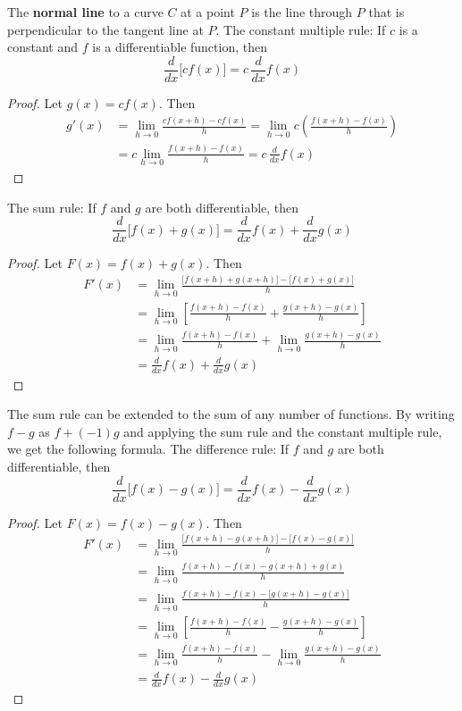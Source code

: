 The \textbf{normal line} to a curve \(C\) at a point \(P\) is the line through
\(P\) that is perpendicular to the tangent line at \(P\).
The constant multiple rule:
If \(c\) is a constant and \(f\) is a differentiable function, then
\[\frac{d}{dx}\bigl[cf(x)\bigr]=c\,\frac{d}{dx}f(x)\]
\begin{proof}
    Let \(g(x)=cf(x)\).
    Then
    \begin{align*}
        g'(x) &= \lim_{h\to 0}\frac{cf(x+h)-cf(x)}{h}
        =\lim_{h\to 0}c\left(\frac{f(x+h)-f(x)}{h}\right) \\
        &= c\lim_{h\to 0}\frac{f(x+h)-f(x)}{h}
        =c\,\frac{d}{dx}f(x)
    \end{align*}
\end{proof}
The sum rule: If \(f\) and \(g\) are both differentiable, then
\[\frac{d}{dx}\bigl[f(x)+g(x)\bigr]=\frac{d}{dx}f(x)+\frac{d}{dx}g(x)\]
\begin{proof}
    Let \(F(x)=f(x)+g(x)\).
    Then
    \begin{align*}
        F'(x) &= \lim_{h\to 0}
        \frac{\bigl[f(x+h)+g(x+h)\bigr]-\bigl[f(x)+g(x)\bigr]}{h} \\
        &= \lim_{h\to 0}
        \left[\frac{f(x+h)-f(x)}{h}+\frac{g(x+h)-g(x)}{h}\right] \\
        &= \lim_{h\to 0}\frac{f(x+h)-f(x)}{h}
        +\lim_{h\to 0}\frac{g(x+h)-g(x)}{h} \\
        &= \frac{d}{dx}f(x)+\frac{d}{dx}g(x)
    \end{align*}
\end{proof}
The sum rule can be extended to the sum of any number of functions.
By writing \(f-g\) as \(f+(-1)g\) and applying the sum rule and the constant
multiple rule, we get the following formula.
The difference rule: If \(f\) and \(g\) are both differentiable, then
\[\frac{d}{dx}\bigl[f(x)-g(x)\bigr]=\frac{d}{dx}f(x)-\frac{d}{dx}g(x)\]
\begin{proof}
    Let \(F(x)=f(x)-g(x)\).
    Then
    \begin{align*}
        F'(x) &= \lim_{h\to 0}
        \frac{\bigl[f(x+h)-g(x+h)\bigr]-\bigl[f(x)-g(x)\bigr]}{h} \\
        &= \lim_{h\to 0}\frac{f(x+h)-f(x)-g(x+h)+g(x)}{h} \\
        &= \lim_{h\to 0}\frac{f(x+h)-f(x)-\bigl[g(x+h)-g(x)\bigr]}{h} \\
        & =\lim_{h\to 0}
        \left[\frac{f(x+h)-f(x)}{h}-\frac{g(x+h)-g(x)}{h}\right] \\
        &= \lim_{h\to 0}
        \frac{f(x+h)-f(x)}{h}-\lim_{h\to 0}\frac{g(x+h)-g(x)}{h} \\
        &= \frac{d}{dx}f(x)-\frac{d}{dx}g(x)
    \end{align*}
\end{proof}

